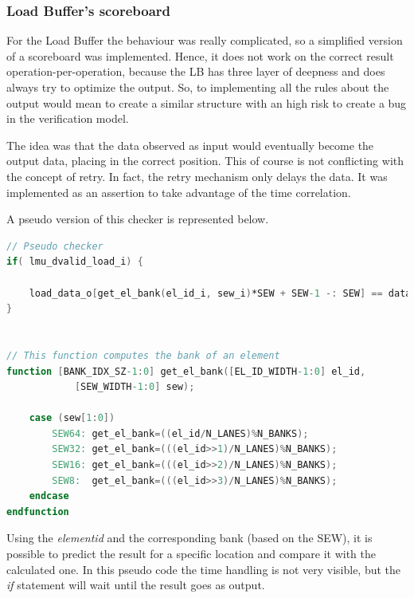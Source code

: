 \subsubsection{Load Buffer's scoreboard}
For the Load Buffer the behaviour was really complicated, so a simplified  version of a scoreboard was implemented.
Hence, it does not work on the correct result operation-per-operation, because the LB has three layer of deepness and does always try to optimize the output. So, to implementing all the rules about the output would mean to create a similar structure with an high risk to create a bug in the verification model.

The idea was that the data observed as input would eventually become the output data, placing in the correct position. This of course is not conflicting with the concept of retry. In fact, the retry mechanism only delays the data.
It was implemented as an assertion to take advantage of the time correlation.

A pseudo version of this checker is represented below.
\bigskip

\linespread{1}

\begin{lstlisting}[language=Verilog,style=verilog-style, backgroundcolor=\color{lyel_palette}, frame=tlb]
// Pseudo checker
if( lmu_dvalid_load_i) { 

    load_data_o[get_el_bank(el_id_i, sew_i)*SEW + SEW-1 -: SEW] == data_i;
}


// This function computes the bank of an element
function [BANK_IDX_SZ-1:0] get_el_bank([EL_ID_WIDTH-1:0] el_id,
            [SEW_WIDTH-1:0] sew);
            
    case (sew[1:0])
        SEW64: get_el_bank=((el_id/N_LANES)%N_BANKS); 
        SEW32: get_el_bank=(((el_id>>1)/N_LANES)%N_BANKS); 
        SEW16: get_el_bank=(((el_id>>2)/N_LANES)%N_BANKS); 
        SEW8:  get_el_bank=(((el_id>>3)/N_LANES)%N_BANKS); 
    endcase
endfunction

\end{lstlisting}

\linespread{1.2}
\bigskip

Using the \emph{element\+id} and the corresponding bank (based on the SEW), it is possible to predict the result for a specific location and compare it with the calculated one. In this pseudo code the time handling is not very visible, but the \emph{if} statement will wait until the result goes as output.

\newpage

